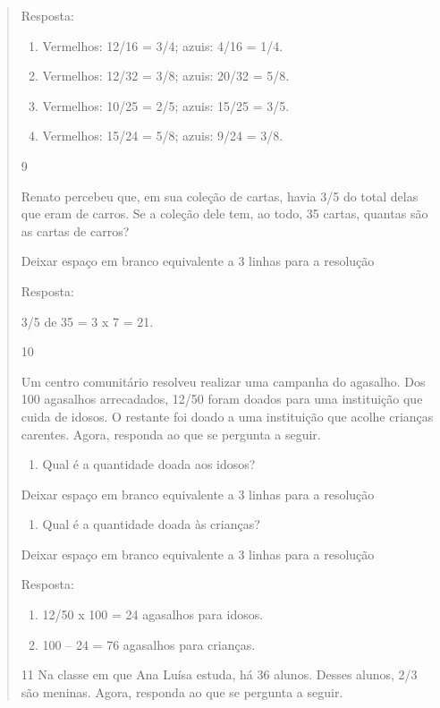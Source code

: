\begin{mdframed}[linewidth=2pt,linecolor=salmao,roundcorner=2pt]
\begin{itemize}
{\begin{itemize}
\begin{escolha}
{\begin{quote}
{\begin{escolha}
{{{{Resposta:

\begin{enumerate}
\item
  Vermelhos: 12/16 = 3/4; azuis: 4/16 = 1/4.
\item
  Vermelhos: 12/32 = 3/8; azuis: 20/32 = 5/8.
\item
  Vermelhos: 10/25 = 2/5; azuis: 15/25 = 3/5.
\item
  Vermelhos: 15/24 = 5/8; azuis: 9/24 = 3/8.
\end{enumerate}

\num{9}

Renato percebeu que, em sua coleção de cartas, havia 3/5 do total delas
que eram de carros. Se a coleção dele tem, ao todo, 35 cartas, quantas são
as cartas de carros?

Deixar espaço em branco equivalente a 3 linhas para a resolução

Resposta:

3/5 de 35 = 3 x 7 = 21.

\num{10}

Um centro comunitário resolveu realizar uma campanha do agasalho. Dos
100 agasalhos arrecadados, 12/50 foram doados para uma instituição que
cuida de idosos. O restante foi doado a uma instituição que acolhe
crianças carentes. Agora, responda ao que se pergunta a seguir.

\begin{enumerate}
\item
  Qual é a quantidade doada aos idosos?
\end{enumerate}

Deixar espaço em branco equivalente a 3 linhas para a resolução

\begin{enumerate}
\item
  Qual é a quantidade doada às crianças?
\end{enumerate}

Deixar espaço em branco equivalente a 3 linhas para a resolução

Resposta:

\begin{enumerate}
\item
  12/50 x 100 = 24 agasalhos para idosos.
\item
  100 -- 24 = 76 agasalhos para crianças.
\end{enumerate}

\num{11} Na classe em que Ana Luísa estuda, há 36 alunos. Desses alunos, 2/3
são meninas. Agora, responda ao que se pergunta a seguir.

}}}}
\end{escolha}}
\end{quote}}
\end{escolha}
\end{itemize}}
\end{itemize}
\end{mdframed}
